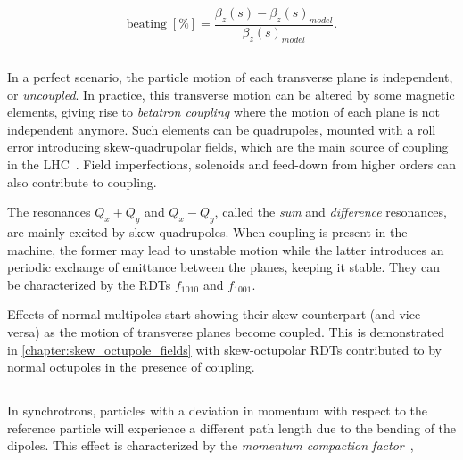 \begin{equation}
    \mathrm{beating \; [\%]}  = \frac{\beta_z(s) - \beta_z(s)_{model}}{\beta_z(s)_{model}}.
    \label{eq:beam_optics:beating}
\end{equation}


\subsection{}

In a perfect scenario, the particle motion of each transverse plane is independent, or
\textit{uncoupled}. In practice, this transverse motion can be altered by some magnetic elements,
giving rise to \textit{betatron coupling} where the motion of each plane is not independent anymore.
Such elements can be quadrupoles, mounted with a roll error introducing skew-quadrupolar fields,
which are the main source of coupling in the LHC~\cite{felix_soubelet_local_2023}. Field
imperfections, solenoids and feed-down from higher orders can also contribute to coupling.

The resonances $Q_x + Q_y$ and $Q_x - Q_y$, called the \textit{sum} and \textit{difference}
resonances, are mainly excited by skew quadrupoles. When coupling is present in the
machine, the former may lead to unstable motion while the latter introduces an periodic exchange of
emittance between the planes, keeping it stable. They can be characterized by the RDTs $f_{1010}$
and $f_{1001}$.

Effects of normal multipoles start showing their skew counterpart (and vice versa) as the motion
of transverse planes become coupled. This is demonstrated in \cref{chapter:skew_octupole_fields}
with skew-octupolar RDTs contributed to by normal octupoles in the presence of coupling.


\subsection{}
\label{subsection:coordinates_systems:momentum_compaction_factor}

In synchrotrons, particles with a deviation in momentum with respect to the reference particle will
experience a different path length due to the bending of the dipoles. This effect is characterized
by the \textit{momentum compaction factor}~\cite{keintzel_jacqueline_beam_nodate},

